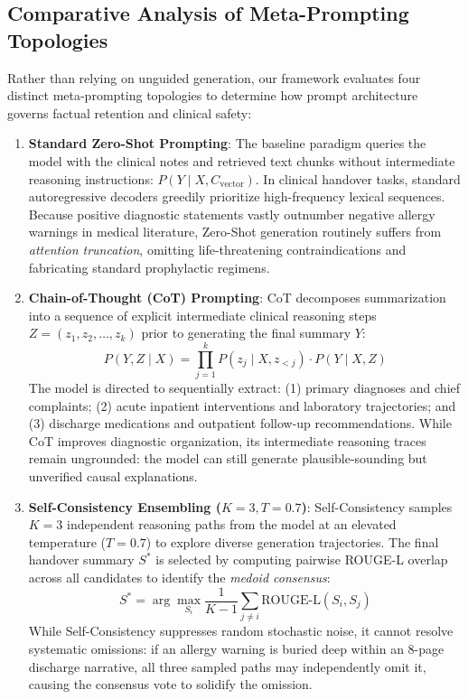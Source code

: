 \documentclass[11pt, a4paper]{article}
\begin{document}
\subsection{Comparative Analysis of Meta-Prompting Topologies}
Rather than relying on unguided generation, our framework evaluates four distinct meta-prompting topologies to determine how prompt architecture governs factual retention and clinical safety:
\begin{enumerate}
  \item \textbf{Standard Zero-Shot Prompting}: The baseline paradigm queries the model with the clinical notes and retrieved text chunks without intermediate reasoning instructions: $P(Y \mid X, C_{\text{vector}})$. In clinical handover tasks, standard autoregressive decoders greedily prioritize high-frequency lexical sequences. Because positive diagnostic statements vastly outnumber negative allergy warnings in medical literature, Zero-Shot generation routinely suffers from \textit{attention truncation}, omitting life-threatening contraindications and fabricating standard prophylactic regimens.
  \item \textbf{Chain-of-Thought (CoT) Prompting}: CoT decomposes summarization into a sequence of explicit intermediate clinical reasoning steps $Z = (z_1, z_2, \dots, z_k)$ prior to generating the final summary $Y$:
  \begin{equation}
    P(Y, Z \mid X) = \prod_{j=1}^k P(z_j \mid X, z_{<j}) \cdot P(Y \mid X, Z)
  \end{equation}
  The model is directed to sequentially extract: (1) primary diagnoses and chief complaints; (2) acute inpatient interventions and laboratory trajectories; and (3) discharge medications and outpatient follow-up recommendations. While CoT improves diagnostic organization, its intermediate reasoning traces remain ungrounded: the model can still generate plausible-sounding but unverified causal explanations.
  \item \textbf{Self-Consistency Ensembling ($K=3, T=0.7$)}: Self-Consistency samples $K = 3$ independent reasoning paths from the model at an elevated temperature ($T = 0.7$) to explore diverse generation trajectories. The final handover summary $S^*$ is selected by computing pairwise ROUGE-L overlap across all candidates to identify the \textit{medoid consensus}:
  \begin{equation}
    S^* = \arg\max_{S_i} \frac{1}{K-1} \sum_{j \neq i} \text{ROUGE-L}(S_i, S_j)
  \end{equation}
  While Self-Consistency suppresses random stochastic noise, it cannot resolve systematic omissions: if an allergy warning is buried deep within an 8-page discharge narrative, all three sampled paths may independently omit it, causing the consensus vote to solidify the omission.

\end{enumerate}
\end{document}
